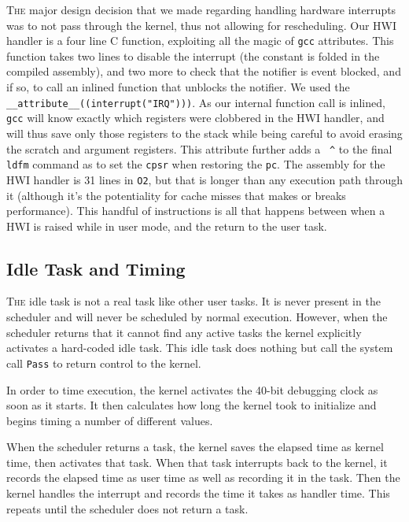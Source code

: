 \documentclass{article}
\begin{document}
\textsc{The} major design decision that we made regarding handling hardware
interrupts was to not pass through the kernel, thus not allowing for
rescheduling. Our HWI handler is a four line C function, exploiting all the
magic of \texttt{gcc} attributes. This function takes two lines to disable the
interrupt (the constant is folded in the compiled assembly), and two more to
check that the notifier is event blocked, and if so, to call an inlined function
that unblocks the notifier. We used the
\texttt{\_\_attribute\_\_((interrupt("IRQ")))}. As our internal function call is
inlined, \texttt{gcc} will know exactly which registers were clobbered in the
HWI handler, and will thus save only those registers to the stack while being
careful to avoid erasing the scratch and argument registers. This attribute
further adds a~ \texttt{\^} to the final \texttt{ldfm} command as to set the
\texttt{cpsr} when restoring the \texttt{pc}. The assembly for the HWI handler
is 31 lines in \texttt{O2}, but that is longer than any execution path through
it (although it's the potentiality for cache misses that makes or breaks
performance). This handful of instructions is all that happens between when a
HWI is raised while in user mode, and the return to the user task.

\subsection*{Idle Task and Timing}

\textsc{The} idle task is not a real task like other user tasks. It is never
present in the scheduler and will never be scheduled by normal execution.
However, when the scheduler returns that it cannot find any active tasks the
kernel explicitly activates a hard-coded idle task. This idle task does nothing
but call the system call \texttt{Pass} to return control to the kernel.

In order to time execution, the kernel activates the 40-bit debugging clock as
soon as it starts. It then calculates how long the kernel took to initialize and
begins timing a number of different values.

When the scheduler returns a task, the kernel saves the elapsed time as kernel
time, then activates that task. When that task interrupts back to the kernel, it
records the elapsed time as user time as well as recording it in the task. Then
the kernel handles the interrupt and records the time it takes as handler time.
This repeats until the scheduler does not return a task.
\end{document}
